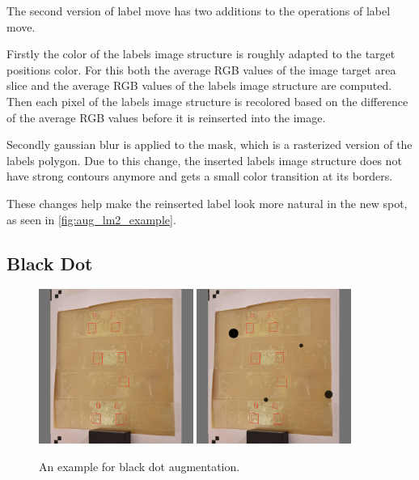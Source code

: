 \documentclass[10pt]{book}
\newcommand{\figureref}[1]{\autoref{#1}}
\begin{document}
The second version of label move has two additions to the operations of label move. 

Firstly the color of the labels image structure is roughly adapted to the target positions color. For this both the average RGB values of the image target area slice and the average RGB values of the labels image structure are computed. Then each pixel of the labels image structure is recolored based on the difference of the average RGB values before it is reinserted into the image.

Secondly gaussian blur is applied to the mask, which is a rasterized version of the labels polygon. Due to this change, the inserted labels image structure does not have strong contours anymore and gets a small color transition at its borders.

These changes help make the reinserted label look more natural in the new spot, as seen in \figureref{fig:aug_lm2_example}.

\subsection{Black Dot}

\begin{figure}
  \centering
     {\includegraphics[width=0.45\textwidth]{image/aug_bd_before}}
     {\includegraphics[width=0.45\textwidth]{image/aug_bd_after}}
  \caption{An example for black dot augmentation.}
  \label{fig:aug_bd_example}
\end{figure}
\end{document}
